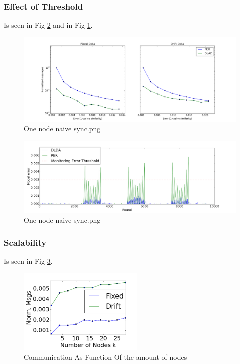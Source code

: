 \documentclass[11pt,twocolumn,varwidth=true,a4paper,fleqn]{article}
\begin{document}
\subsubsection{Effect of Threshold}
Is seen in Fig \ref{PERvsDLDAoverTime} and in Fig  \ref{PERvsDLDAoverError}.
	\begin{figure}[ht]
	\centering
	\includegraphics[width=\textwidth]{PER/PERvsDLDAoverError.png}
	\caption{One node naive sync.png}
	\label{PERvsDLDAoverError}
	\end{figure}

	\begin{figure}[ht]
	\centering
	\includegraphics[width=\textwidth]{PER/PERvsDLDAoverTime.png}
	\caption{One node naive sync.png}
	\label{PERvsDLDAoverTime}
	\end{figure}
\subsubsection{Scalability}
Is seen in Fig \ref{Nodes}.
	\begin{figure}[h]
	\centering
	\includegraphics[width=60mm]{CommunicationOfFixedVsDrift/Nodes.png}
	\caption{Communication As Function Of the amount of nodes}
	\label{Nodes}
	\end{figure}
\end{document}
